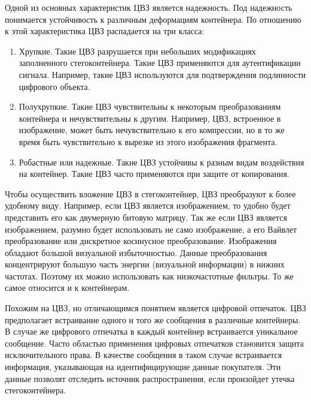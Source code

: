 Одной из основных характеристик ЦВЗ является надежность.
Под надежность понимается устойчивость к различным деформациям контейнера.
По отношению к этой характеристика ЦВЗ распадается на три класса:
\begin{enumerate}
    \item Хрупкие.
    Такие ЦВЗ разрушается при небольших модификациях заполненного стегоконтейнера.
    Такие ЦВЗ применяются для аутентификации сигнала.
    Например, такие ЦВЗ используются для подтверждения подлинности цифрового объекта.
    \item Полухрупкие.
    Такие ЦВЗ чувствительны к некоторым преобразованиям контейнера и нечувствительны к другим.
    Например, ЦВЗ, встроенное в изображение, может быть нечувствительно к его компрессии,
    но в то же время быть чувствительно к вырезке из этого изображения фрагмента.
    \item Робастные или надежные.
    Такие ЦВЗ устойчивы к разным видам воздействия на контейнер.
    Такие ЦВЗ часто применяются при защите от копирования.
\end{enumerate}

Чтобы осуществить вложение ЦВЗ в стегоконтейнер, ЦВЗ преобразуют к более удобному виду.
Например, если ЦВЗ является изображением, то удобно будет представить его как двумерную
битовую матрицу. Так же если ЦВЗ является изображением, разумно будет использовать не само
изображение, а его Вайвлет преобразование или дискретное косинусное преобразование. 
Изображения обладают большой визуальной избыточностью.
Данные преобразования концентрируют большую часть энергии (визуальной информации) в нижних частотах.
Поэтому их можно использовать как низкочастотные фильтры. То же самое относится и к контейнерам.

Похожим на ЦВЗ, но отличающимся понятием является цифровой отпечаток.
ЦВЗ предполагает встраивание одного и того же сообщения в различные контейнеры.
В случае же цифрового отпечатка в каждый контейнер встраивается уникальное сообщение.
Часто областью применения цифровых отпечатков становится защита исключительного права.
В качестве сообщения в таком случае встраивается информация, указывающая на идентифицирующие данные покупателя.
Эти данные позволят отследить источник распространения, если произойдет утечка стегоконтейнера.

